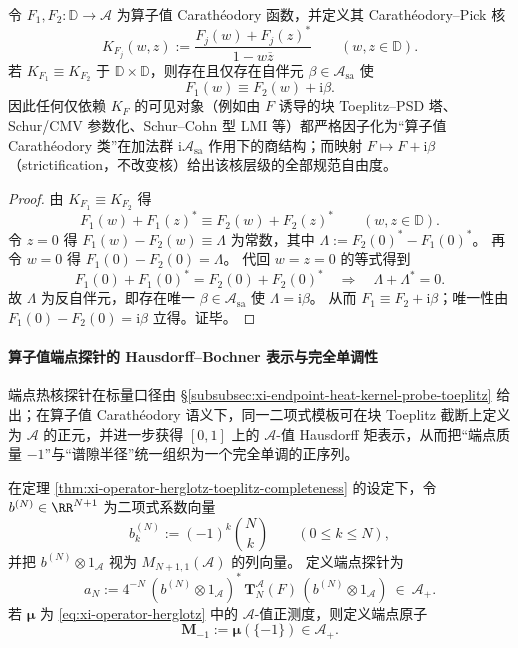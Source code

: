 \begin{theorem}\label{thm:xi-carath-pick-kernel-normalization-rigidity}
令 \(F_1,F_2:\mathbb{D}\to\mathcal{A}\) 为算子值 Carath\'eodory 函数，并定义其 Carath\'eodory--Pick 核
\[
K_{F_j}(w,z):=\frac{F_j(w)+F_j(z)^\ast}{1-w\overline z}
\qquad(w,z\in\mathbb{D}).
\]
若 \(K_{F_1}\equiv K_{F_2}\) 于 \(\mathbb{D}\times\mathbb{D}\)，则存在且仅存在自伴元 \(\beta\in\mathcal{A}_{\mathrm{sa}}\) 使
\[
F_1(w)\equiv F_2(w)+\mathrm{i}\beta.
\]
因此任何仅依赖 \(K_F\) 的可见对象（例如由 \(F\) 诱导的块 Toeplitz--PSD 塔、Schur/CMV 参数化、Schur--Cohn 型 LMI 等）都严格因子化为“算子值 Carath\'eodory 类”在加法群 \( \mathrm{i}\mathcal{A}_{\mathrm{sa}} \) 作用下的商结构；而映射 \(F\mapsto F+\mathrm{i}\beta\)（strictification，不改变核）给出该核层级的全部规范自由度。
\end{theorem}

\begin{proof}
由 \(K_{F_1}\equiv K_{F_2}\) 得
\[
F_1(w)+F_1(z)^\ast\equiv F_2(w)+F_2(z)^\ast\qquad(w,z\in\mathbb{D}).
\]
令 \(z=0\) 得 \(F_1(w)-F_2(w)\equiv \Lambda\) 为常数，其中
\(
\Lambda:=F_2(0)^\ast-F_1(0)^\ast
\)。
再令 \(w=0\) 得 \(F_1(0)-F_2(0)=\Lambda\)。
代回 \(w=z=0\) 的等式得到
\[
F_1(0)+F_1(0)^\ast=F_2(0)+F_2(0)^\ast
\quad\Longrightarrow\quad
\Lambda+\Lambda^\ast=0.
\]
故 \(\Lambda\) 为反自伴元，即存在唯一 \(\beta\in\mathcal{A}_{\mathrm{sa}}\) 使 \(\Lambda=\mathrm{i}\beta\)。
从而 \(F_1\equiv F_2+\mathrm{i}\beta\)；唯一性由 \(F_1(0)-F_2(0)=\mathrm{i}\beta\) 立得。证毕。
\end{proof}

\paragraph{算子值端点探针的 Hausdorff--Bochner 表示与完全单调性}
端点热核探针在标量口径由 \S\ref{subsubsec:xi-endpoint-heat-kernel-probe-toeplitz} 给出；在算子值 Carath\'eodory 语义下，同一二项式模板可在块 Toeplitz 截断上定义为 \(\mathcal{A}\) 的正元，并进一步获得 \([0,1]\) 上的 \(\mathcal{A}\)-值 Hausdorff 矩表示，从而把“端点质量 \(-1\)”与“谱隙半径”统一组织为一个完全单调的正序列。

\begin{definition}\label{def:xi-operator-endpoint-probe}
在定理 \ref{thm:xi-operator-herglotz-toeplitz-completeness} 的设定下，令 \(b^{(N)}\in\RR^{N+1}\) 为二项式系数向量
\[
b^{(N)}_k:=(-1)^k\binom{N}{k}\qquad(0\le k\le N),
\]
并把 \(b^{(N)}\otimes 1_{\mathcal{A}}\) 视为 \(M_{N+1,1}(\mathcal{A})\) 的列向量。
定义端点探针为
\begin{equation}\label{eq:xi-operator-endpoint-probe-def}
\boxed{\;
a_N:=4^{-N}\,(b^{(N)}\otimes 1_{\mathcal{A}})^\ast\,\mathbf{T}^{\mathcal{A}}_N(F)\,(b^{(N)}\otimes 1_{\mathcal{A}})\ \in\ \mathcal{A}_+.\;}
\end{equation}
若 \(\boldsymbol\mu\) 为 \eqref{eq:xi-operator-herglotz} 中的 \(\mathcal{A}\)-值正测度，则定义端点原子
\[
\mathbf{M}_{-1}:=\boldsymbol\mu(\{-1\})\in\mathcal{A}_+.
\]
\end{definition}

